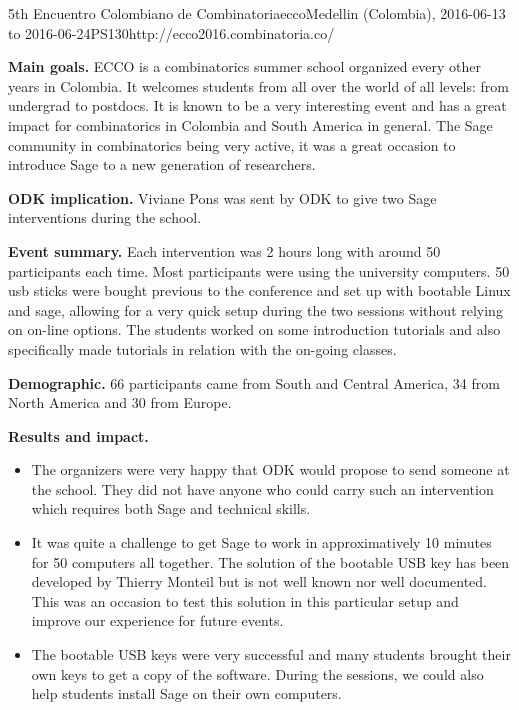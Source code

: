 \begin{event}{5th Encuentro Colombiano de Combinatoria}{ecco}{Medellin (Colombia), 2016-06-13 to 2016-06-24}{PS}{130}{http://ecco2016.combinatoria.co/}

\textbf{Main goals.} ECCO is a combinatorics summer school organized every other years in Colombia. It welcomes 
students from all over the world of all levels: from undergrad to postdocs. It is known to be a very
interesting event and has a great impact for combinatorics in Colombia and South America in general.
The Sage community in combinatorics being very active, it was a great occasion to introduce Sage
to a new generation of researchers.

\textbf{ODK implication.} Viviane Pons was sent by ODK to give two Sage interventions
during the school.

\textbf{Event summary.} Each intervention was 2 hours long with around 50 participants each time.
Most participants were using the university computers. 50 usb sticks were bought previous
to the conference and set up with bootable Linux and sage, allowing for a very quick setup
during the two sessions without relying on on-line options. The students worked on some
introduction tutorials and also specifically made tutorials in relation with the on-going
classes.  

\textbf{Demographic.} 66 participants came from South and Central America, 34 from North America
and 30 from Europe. 

\textbf{Results and impact.} 
\begin{itemize}
\item The organizers were very happy that ODK would propose to send someone at the school. 
They did not have anyone who could carry such an intervention which requires both Sage and
technical skills.

\item It was quite a challenge to get Sage to work in approximatively 10 minutes for 50
computers all together. The solution of the bootable USB key has been developed by Thierry
Monteil but is not well known nor well documented. This was an occasion to test this solution
in this particular setup and improve our experience for future events.

\item The bootable USB keys were very successful and many students brought their own keys to
get a copy of the software. During the sessions, we could also help students install
Sage on their own computers.


\end{itemize}
\end{event}
